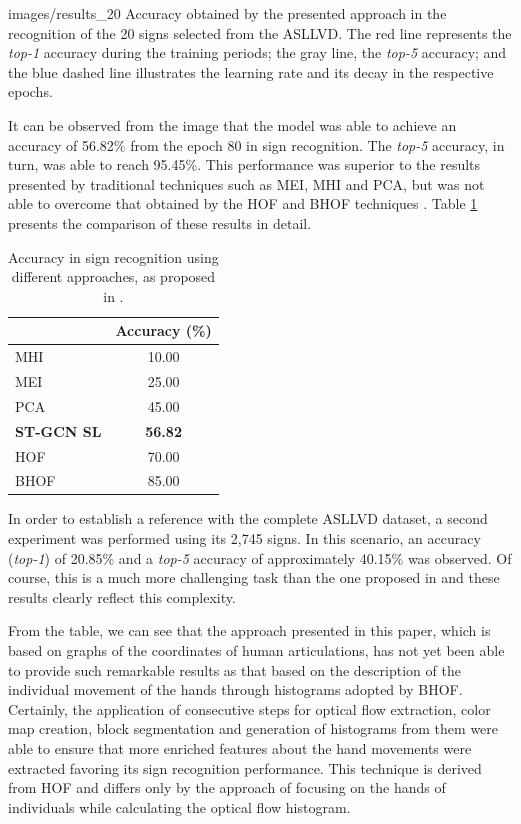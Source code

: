     {images/results_20}
    {Accuracy obtained by the presented approach in the recognition of the 20 signs selected from the ASLLVD. The red line represents the \textit{top-1} accuracy during the training periods; the gray line, the \textit{top-5} accuracy; and the blue dashed line illustrates the learning rate and its decay in the respective epochs.}

It can be observed from the image that the model was able to achieve an accuracy of 56.82\% from the epoch 80 in sign recognition. The \textit{top-5} accuracy, in turn, was able to reach 95.45\%. This performance was superior to the results presented by traditional techniques such as MEI, MHI and PCA, but was not able to overcome that obtained by the HOF and BHOF techniques \cite{lim-2016}. Table \ref{tab:results-comparison-20} presents the comparison of these results in detail.

\begin{table}[ht]
\centering
\caption{Accuracy in sign recognition using different approaches, as proposed in \cite{lim-2016}.}
\label{tab:results-comparison-20}
\begin{tabular}{lc}
\hline
                   & Accuracy (\%)  \\ \hline
MHI                & 10.00                     \\
MEI                & 25.00                     \\
PCA                & 45.00                     \\
\textbf{ST-GCN SL} & \textbf{56.82}            \\
HOF                & 70.00                     \\
BHOF               & 85.00                     \\ \hline
\end{tabular}
\end{table}

In order to establish a reference with the complete ASLLVD dataset, a second experiment was performed using its 2,745 signs. In this scenario, an accuracy (\textit{top-1}) of 20.85\% and a \textit{top-5} accuracy of approximately 40.15\% was observed. Of course, this is a much more challenging task than the one proposed in \cite{lim-2016} and these results clearly reflect this complexity.

From the table, we can see that the approach presented in this paper, which is based on graphs of the coordinates of human articulations, has not yet been able to provide such remarkable results as that based on the description of the individual movement of the hands through histograms adopted by BHOF. Certainly, the application of consecutive steps for optical flow extraction, color map creation, block segmentation and generation of histograms from them were able to ensure that more enriched features about the hand movements were extracted favoring its sign recognition performance. This technique is derived from HOF and differs only by the approach of focusing on the hands of individuals while calculating the optical flow histogram.

